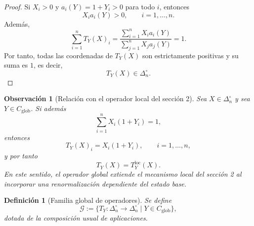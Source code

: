 \documentclass[12pt]{article}
\newtheorem{definicion}{Definición}[section]
\newtheorem{observacion}{Observación}[section]
\begin{document}
\begin{proof}
Si $X_i>0$ y $a_i(Y)=1+Y_i>0$ para todo $i$, entonces
\[
X_i a_i(Y)>0,\qquad i=1,\dots,n.
\]
Además,
\[
\sum_{i=1}^n T_Y(X)_i
=
\frac{\sum_{i=1}^n X_i a_i(Y)}{\sum_{j=1}^n X_j a_j(Y)}
=
1.
\]
Por tanto, todas las coordenadas de $T_Y(X)$ son estrictamente positivas y su suma es $1$, es decir,
\[
T_Y(X)\in\Delta_n^\circ.
\]
\end{proof}

\begin{observacion}[Relación con el operador local del sección 2]\label{obs:localVsGlobal}
Sea $X\in\Delta_n^\circ$ y sea $Y\in C_{\mathrm{glob}}$. Si además
\[
\sum_{i=1}^n X_i(1+Y_i)=1,
\]
entonces
\[
T_Y(X)_i=X_i(1+Y_i),\qquad i=1,\dots,n,
\]
y por tanto
\[
T_Y(X)=T_Y^{\mathrm{loc}}(X).
\]
En este sentido, el operador global extiende el mecanismo local del sección 2 al incorporar una renormalización dependiente del estado base.
\end{observacion}

\begin{definicion}[Familia global de operadores]\label{def:G}
Se define
\[
\mathcal G
:=
\bigl\{
T_Y:\Delta_n^\circ\to\Delta_n^\circ
\;\big|\;
Y\in C_{\mathrm{glob}}
\bigr\},
\]
dotada de la composición usual de aplicaciones.
\end{definicion}
\end{document}
